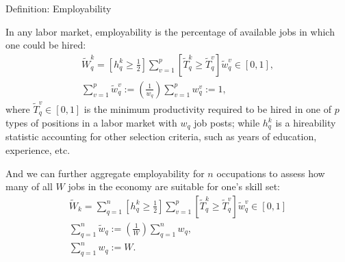 \documentclass[hidelinks, nonatbib]{elsarticle}
\begin{document}
\begin{enumerate}
Definition: Employability

In any labor market, employability is the percentage of available jobs in which one could be hired:
\begin{gather}
    \tilde{W}_{q}^{k}
    =
    \left[
        h_{q}^{k}
        \geq
        \frac{1}{2}
    \right]
    \sum_{v=1}^{p}
    \left[
        \tilde{T}_{q}^{k}
        \geq
        \tilde{T}_{q}^{v}
    \right]
    \tilde{w}_{q}^{v}
    \in
    [0,1]
    ,
    \\
    \sum_{v=1}^{p}
    \tilde{w}_{q}^{v}
    :=
    \left(
        \frac{1}{w_q}
    \right)
    \sum_{v=1}^{p}
    w_{q}^{v}
    := 1
    ,
\end{gather}
where $\tilde{T}_{q}^{v} \in [0,1]$ is the minimum productivity required to be hired in one of $p$ types of positions in a labor market with $w_q$ job posts; while $h_{q}^{k}$ is a hireability statistic accounting for other selection criteria, such as years of education, experience, etc.

And we can further aggregate employability for $n$ occupations to assess how many of all $W$ jobs in the economy are suitable for one's skill set:
\begin{gather}
    \tilde{W}_{k}
    =
    \sum_{q=1}^{n}
    \left[
        h_{q}^{k}
        \geq
        \frac{1}{2}
    \right]
    \sum_{v=1}^{p}
    \left[
        \tilde{T}_{q}^{k}
        \geq
        \tilde{T}_{q}^{v}
    \right]
    \tilde{w}_{q}^{v}
    \in
    [0,1]
    \\
    \sum_{q=1}^{n}
    \tilde{w}_{q}
    :=
    \left(
        \frac{1}{W}
    \right)
    \sum_{q=1}^{n}
    {w}_{q}
    ,
    \\
    \sum_{q=1}^{n}
    {w}_{q}
    :=
    W
    .
\end{gather}


\end{enumerate}
\end{document}
